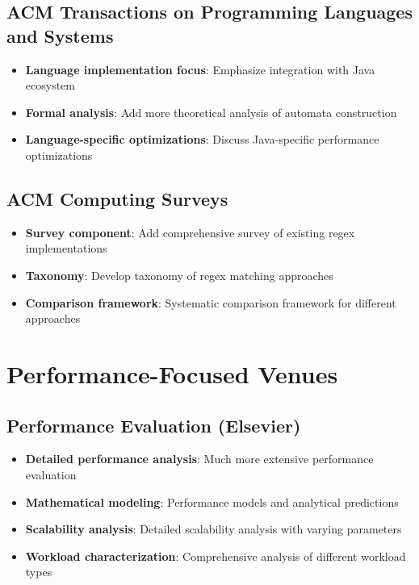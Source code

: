 \documentclass{article}
\begin{document}
\subsection{ACM Transactions on Programming Languages and Systems}
\begin{itemize}
\item \textbf{Language implementation focus}: Emphasize integration with Java ecosystem
\item \textbf{Formal analysis}: Add more theoretical analysis of automata construction
\item \textbf{Language-specific optimizations}: Discuss Java-specific performance optimizations
\end{itemize}

\subsection{ACM Computing Surveys}
\begin{itemize}
\item \textbf{Survey component}: Add comprehensive survey of existing regex implementations
\item \textbf{Taxonomy}: Develop taxonomy of regex matching approaches
\item \textbf{Comparison framework}: Systematic comparison framework for different approaches
\end{itemize}

\section{Performance-Focused Venues}

\subsection{Performance Evaluation (Elsevier)}
\begin{itemize}
\item \textbf{Detailed performance analysis}: Much more extensive performance evaluation
\item \textbf{Mathematical modeling}: Performance models and analytical predictions
\item \textbf{Scalability analysis}: Detailed scalability analysis with varying parameters
\item \textbf{Workload characterization}: Comprehensive analysis of different workload types
\end{itemize}
\end{document}
